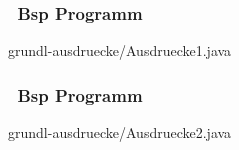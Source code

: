 \begin{frame}[t]%
  \frametitle{\stitle\ Bsp Programm}


{grundl-ausdruecke/Ausdruecke1.java}
\end{frame}


\begin{frame}[t]%
  \frametitle{\stitle\ Bsp Programm}


{grundl-ausdruecke/Ausdruecke2.java}
\end{frame}